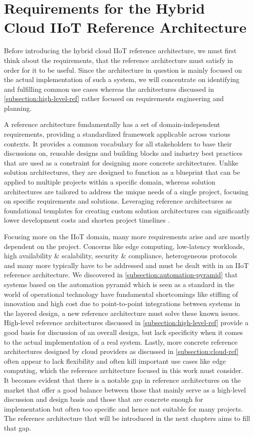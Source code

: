 \section{Requirements for the Hybrid Cloud IIoT Reference Architecture}
    Before introducing the hybrid cloud IIoT reference architecture, we must first think about the requirements, that the reference architecture must satisfy in order for it to be useful. Since the architecture in question is mainly focused on the actual implementation of such a system, we will concentrate on identifying and fulfilling common use cases whereas the architectures discussed in \autoref{subsection:high-level-ref} rather focused on requirements engineering and planning. 

    A reference architecture fundamentally has a set of domain-independent requirements, providing a standardized framework applicable across various contexts. It provides a common vocabulary for all stakeholders to base their discussions on, reusable designs and building blocks and industry best practices that are used as a constraint for designing more concrete architectures. Unlike solution architectures, they are designed to function as a blueprint that can be applied to multiple projects within a specific domain, whereas solution architectures are tailored to address the unique needs of a single project, focusing on specific requirements and solutions. Leveraging reference architectures as foundational templates for creating custom solution architectures can significantly lower development costs and shorten project timelines \cite{reference_architecture_in_general}.

    Focusing more on the IIoT domain, many more requirements arise and are mostly dependent on the project. Concerns like edge computing, low-latency workloads, high availability \& scalability, security \& compliance, heterogeneous protocols and many more typically have to be addressed and must be dealt with in an IIoT reference architecture. We discovered in \autoref{subsection:automation-pyramid} that systems based on the automation pyramid which is seen as a standard in the world of operational technology have fundamental shortcomings like stifling of innovation and high cost due to point-to-point integrations between systems in the layered design, a new reference architecture must solve these known issues. High-level reference architectures discussed in \autoref{subsection:high-level-ref} provide a good basis for discussion of an overall design, but lack specificity when it comes to the actual implementation of a real system. Lastly, more concrete reference architectures designed by cloud providers as discussed in \autoref{subsection:cloud-ref} often appear to lack flexibility and often kill important use cases like edge computing, which the reference architecture focused in this work must consider. It becomes evident that there is a notable gap in reference architectures on the market that offer a good balance between those that mainly serve as a high-level discussion and design basis and those that are concrete enough for implementation but often too specific and hence not suitable for many projects. The reference architecture that will be introduced in the next chapters aims to fill that gap.

